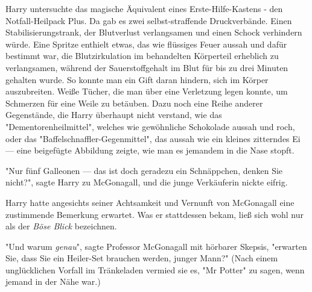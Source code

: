 {Harry untersuchte das magische Äquivalent eines Erste-Hilfe-Kastens - den Notfall-Heilpack Plus. Da gab es zwei selbst-straffende Druckverbände. Einen Stabilisierungstrank, der Blutverlust verlangsamen und einen Schock verhindern würde. Eine Spritze enthielt etwas, das wie flüssiges Feuer aussah und dafür bestimmt war, die Blutzirkulation im behandelten Körperteil erheblich zu verlangsamen, während der Sauerstoffgehalt im Blut für bis zu drei Minuten gehalten wurde. So konnte man ein Gift daran hindern, sich im Körper auszubreiten. Weiße Tücher, die man über eine Verletzung legen konnte, um Schmerzen für eine Weile zu betäuben. Dazu noch eine Reihe anderer Gegenstände, die Harry überhaupt nicht verstand, wie das "Dementorenheilmittel", welches wie gewöhnliche Schokolade aussah und roch, oder das "Baffelschnaffler-Gegenmittel", das aussah wie ein kleines zitterndes Ei --- eine beigefügte Abbildung zeigte, wie man es jemandem in die Nase stopft.

"Nur fünf Galleonen --- das ist doch geradezu ein Schnäppchen, denken Sie nicht?", sagte Harry zu McGonagall, und die junge Verkäuferin nickte eifrig.

Harry hatte angesichts seiner Achtsamkeit und Vernunft von McGonagall eine zustimmende Bemerkung erwartet. Was er stattdessen bekam, ließ sich wohl nur als der \emph{Böse Blick} bezeichnen.

"Und warum \emph{genau}", sagte Professor McGonagall mit hörbarer Skepsis, "erwarten Sie, dass Sie ein Heiler-Set brauchen werden, junger Mann?" (Nach einem unglücklichen Vorfall im Tränkeladen vermied sie es, "Mr Potter" zu sagen, wenn jemand in der Nähe war.)

}
